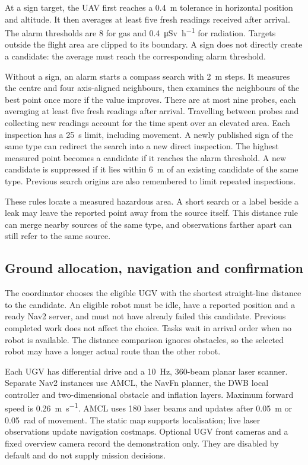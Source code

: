 \documentclass[conference]{IEEEtran}
\begin{document}
At a sign target, the UAV first reaches a \SI{0.4}{\metre} tolerance in horizontal position and altitude. It then averages at least five fresh readings received after arrival. The alarm thresholds are \SI{8}{\ppm} for gas and \SI{0.4}{\micro\sievert\per\hour} for radiation. Targets outside the flight area are clipped to its boundary. A sign does not directly create a candidate: the average must reach the corresponding alarm threshold.

Without a sign, an alarm starts a compass search with \SI{2}{\metre} steps. It measures the centre and four axis-aligned neighbours, then examines the neighbours of the best point once more if the value improves. There are at most nine probes, each averaging at least five fresh readings after arrival. Travelling between probes and collecting new readings account for the time spent over an elevated area. Each inspection has a \SI{25}{\second} limit, including movement. A newly published sign of the same type can redirect the search into a new direct inspection. The highest measured point becomes a candidate if it reaches the alarm threshold. A new candidate is suppressed if it lies within \SI{6}{\metre} of an existing candidate of the same type. Previous search origins are also remembered to limit repeated inspections.

These rules locate a measured hazardous area. A short search or a label beside a leak may leave the reported point away from the source itself. This distance rule can merge nearby sources of the same type, and observations farther apart can still refer to the same source.

\subsection{Ground allocation, navigation and confirmation}
The coordinator chooses the eligible UGV with the shortest straight-line distance to the candidate. An eligible robot must be idle, have a reported position and a ready Nav2 server, and must not have already failed this candidate. Previous completed work does not affect the choice. Tasks wait in arrival order when no robot is available. The distance comparison ignores obstacles, so the selected robot may have a longer actual route than the other robot.

Each UGV has differential drive and a \SI{10}{\hertz}, 360-beam planar laser scanner. Separate Nav2 instances use AMCL, the NavFn planner, the DWB local controller and two-dimensional obstacle and inflation layers. Maximum forward speed is \SI{0.26}{\metre\per\second}. AMCL uses 180 laser beams and updates after \SI{0.05}{\metre} or \SI{0.05}{\radian} of movement. The static map supports localisation; live laser observations update navigation costmaps. Optional UGV front cameras and a fixed overview camera record the demonstration only. They are disabled by default and do not supply mission decisions.
\end{document}
